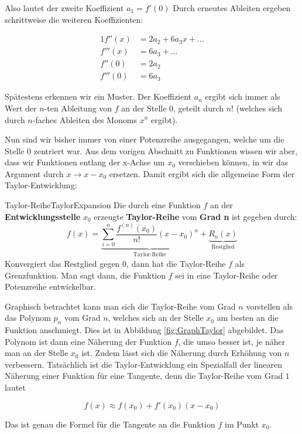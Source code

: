 Also lautet der zweite Koeffizient $a_1 = f'(0)$ Durch erneutes Ableiten ergeben schrittweise die weiteren Koeffizienten:

\begin{alignat*}{1}
    f''(x)  &= 2 a_2 + 6 a_3 x + \dots \\
    f'''(x) &= 6 a_3 + \dots \\
    f''(0)  &= 2 a_2 \\
    f'''(0) &= 6 a_3
\end{alignat*}

Spätestens erkennen wir ein Muster. Der Koeffizient $a_n$ ergibt sich immer als Wert der $n$-ten Ableitung von $f$ an der Stelle $0$, geteilt durch $n!$ (welches sich durch $n$-faches Ableiten des Monoms $x^n$ ergibt).

Nun sind wir bisher immer von einer Potenzreihe ausgegangen, welche um die Stelle $0$ zentriert war. Aus dem vorigen Abschnitt zu Funktionen wissen wir aber, dass wir Funktionen entlang der x-Achse um $x_0$ verschieben können, in wir das Argument durch $x \to x-x_0$ ersetzen. Damit ergibt sich die allgemeine Form der Taylor-Entwicklung:

\begin{definition}{Taylor-Reihe}{TaylorExpansion}
    Die durch eine Funktion $f$ an der \textbf{Entwicklungsstelle} $x_0$ erzeugte \textbf{Taylor-Reihe} vom \textbf{Grad n} ist gegeben durch:
    $$
        f(x) = \underbrace{\sum\limits_{i=0}^n \frac{f^{(n)}(x_0)}{n!} (x-x_0)^n}_{\text{Taylor-Reihe}} + \underbrace{R_n(x)}_{\text{Restglied}}
    $$
    Konvergiert das Restglied gegen $0$, dann hat die Taylor-Reihe $f$ als Grenzfunktion. Man sagt dann, die Funktion $f$ sei in eine Taylor-Reihe oder Potenzreihe entwickelbar.
\end{definition}

Graphisch betrachtet kann man sich die Taylor-Reihe vom Grad $n$ vorstellen als das Polynom $p_n$ vom Grad $n$, welches sich an der Stelle $x_0$ am besten an die Funktion anschmiegt. Dies ist in Abbildung \ref{fig:GraphTaylor} abgebildet. Das Polynom ist dann eine Näherung der Funktion $f$, die umso besser ist, je näher man an der Stelle $x_0$ ist. Zudem lässt sich die Näherung durch Erhöhung von $n$ verbessern. Tatsächlich ist die Taylor-Entwicklung ein Spezialfall der linearen Näherung einer Funktion für eine Tangente, denn die Taylor-Reihe vom Grad $1$ lautet

$$
    f(x) \approx f(x_0) + f'(x_0) (x-x_0)
$$

Das ist genau die Formel für die Tangente an die Funktion $f$ im Punkt $x_0$.

